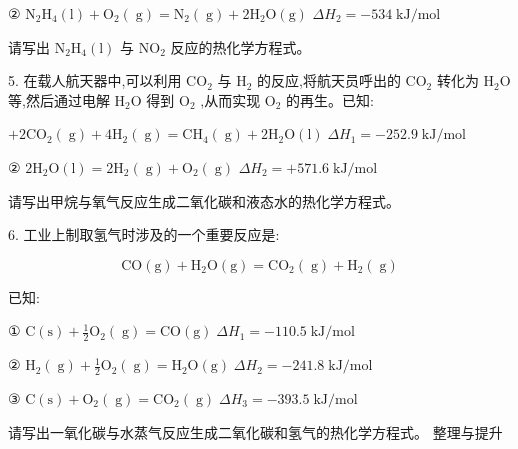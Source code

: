 \documentclass[10pt]{article}
\begin{document}
② \({\mathrm{N}}_{2}{\mathrm{H}}_{4}\left( \mathrm{l}\right) + {\mathrm{O}}_{2}\left( \mathrm{\;g}\right) = {\mathrm{N}}_{2}\left( \mathrm{\;g}\right) + 2{\mathrm{H}}_{2}\mathrm{O}\left( \mathrm{g}\right)\) \(\Delta {H}_{2} = - {534}\mathrm{\;{kJ}}/\mathrm{{mol}}\)

请写出 \({\mathrm{N}}_{2}{\mathrm{H}}_{4}\left( \mathrm{l}\right)\) 与 \({\mathrm{{NO}}}_{2}\) 反应的热化学方程式。

5. 在载人航天器中,可以利用 \({\mathrm{{CO}}}_{2}\) 与 \({\mathrm{H}}_{2}\) 的反应,将航天员呼出的 \({\mathrm{{CO}}}_{2}\) 转化为 \({\mathrm{H}}_{2}\mathrm{O}\) 等,然后通过电解 \({\mathrm{H}}_{2}\mathrm{O}\) 得到 \({\mathrm{O}}_{2}\) ,从而实现 \({\mathrm{O}}_{2}\) 的再生。已知:

\(+ 2{\mathrm{{CO}}}_{2}\left( \mathrm{\;g}\right) + 4{\mathrm{H}}_{2}\left( \mathrm{\;g}\right) = {\mathrm{{CH}}}_{4}\left( \mathrm{\;g}\right) + 2{\mathrm{H}}_{2}\mathrm{O}\left( \mathrm{l}\right) \;\Delta {H}_{1} = - {252.9}\mathrm{\;{kJ}}/\mathrm{{mol}}\)

② \(2{\mathrm{H}}_{2}\mathrm{O}\left( \mathrm{l}\right) = 2{\mathrm{H}}_{2}\left( \mathrm{\;g}\right) + {\mathrm{O}}_{2}\left( \mathrm{\;g}\right)\) \(\Delta {H}_{2} = + {571.6}\mathrm{\;{kJ}}/\mathrm{{mol}}\)

请写出甲烷与氧气反应生成二氧化碳和液态水的热化学方程式。

6. 工业上制取氢气时涉及的一个重要反应是:

\[
\mathrm{{CO}}\left( \mathrm{g}\right) + {\mathrm{H}}_{2}\mathrm{O}\left( \mathrm{g}\right) = {\mathrm{{CO}}}_{2}\left( \mathrm{\;g}\right) + {\mathrm{H}}_{2}\left( \mathrm{\;g}\right)
\]

已知:

① \(\mathrm{C}\left( \mathrm{s}\right) + \frac{1}{2}{\mathrm{O}}_{2}\left( \mathrm{\;g}\right) = \mathrm{{CO}}\left( \mathrm{g}\right) \;\Delta {H}_{1} = - {110.5}\mathrm{\;{kJ}}/\mathrm{{mol}}\)

② \({\mathrm{H}}_{2}\left( \mathrm{\;g}\right) + \frac{1}{2}{\mathrm{O}}_{2}\left( \mathrm{\;g}\right) = {\mathrm{H}}_{2}\mathrm{O}\left( \mathrm{g}\right) \;\Delta {H}_{2} = - {241.8}\mathrm{\;{kJ}}/\mathrm{{mol}}\)

③ \(\mathrm{C}\left( \mathrm{s}\right) + {\mathrm{O}}_{2}\left( \mathrm{\;g}\right) = {\mathrm{{CO}}}_{2}\left( \mathrm{\;g}\right) \;\Delta {H}_{3} = - {393.5}\mathrm{\;{kJ}}/\mathrm{{mol}}\)

请写出一氧化碳与水蒸气反应生成二氧化碳和氢气的热化学方程式。 整理与提升
\end{document}
